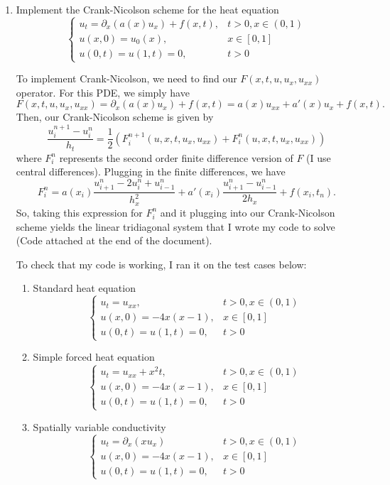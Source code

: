 \documentclass[a4paper,12pt]{article}
\begin{document}
\begin{enumerate}[label = (\arabic*)]
	\item Implement the Crank-Nicolson scheme for the heat equation
	\[
		\begin{cases}
			u_t = \partial_x (a(x) u_x) + f(x,t), & t > 0, x\in (0,1) \\
			u(x,0) = u_0(x), & x \in [0,1] \\
			u(0,t) = u(1,t) = 0, & t > 0
		\end{cases}
	\]
	
	To implement Crank-Nicolson, we need to find our $ F(x,t,u,u_x, u_{xx}) $ operator. For this PDE, we simply have
	\[
		F(x,t,u,u_x,u_{xx}) = \partial_x(a(x) u_x) + f(x,t) = a(x) u_{xx} + a'(x) u_x + f(x,t).
	\]
	Then, our Crank-Nicolson scheme is given by
	\[
		\frac{u_i^{n + 1} - u_i^n}{h_t} = \frac{1}{2}\left(F_i^{n + 1}(u, x, t, u_x, u_{xx}) + F_i^{n}(u, x, t, u_x, u_{xx})\right)
	\]
	where $ F_i^n $ represents the second order finite difference version of $ F $ (I use central differences). Plugging in the finite differences, we have
	\[
		F_i^n = a(x_i) \frac{u_{i+1}^n - 2u_{i}^n + u_{i - 1}^n}{h_x^2} + a'(x_i) \frac{u_{i+1}^n - u_{i - 1}^n}{2h_x} + f(x_i, t_n).
	\]
	So, taking this expression for $ F_i^n $ and it plugging into our Crank-Nicolson scheme yields the linear tridiagonal system that I wrote my code to solve (Code attached at the end of the document).

	To check that my code is working, I ran it on the test cases below:
	\begin{enumerate}[label = (\alph*)]
		\item Standard heat equation
			\[
				\begin{cases}
					u_t = u_{xx}, & t > 0, x\in (0,1) \\
					u(x,0) = -4x(x-1), & x \in [0,1] \\
					u(0,t) = u(1,t) = 0, & t > 0
				\end{cases}
			\]
			
		\item Simple forced heat equation
			\[
				\begin{cases}
					u_t = u_{xx} + x^2 t, & t > 0, x\in (0,1) \\
					u(x,0) = -4x(x-1), & x \in [0,1] \\
					u(0,t) = u(1,t) = 0, & t > 0
				\end{cases}
			\]
		
		\item Spatially variable conductivity
			\[
				\begin{cases}
					u_t = \partial_x(x u_x) & t > 0, x\in (0,1) \\
					u(x,0) = -4x(x-1), & x \in [0,1] \\
					u(0,t) = u(1,t) = 0, & t > 0
				\end{cases}
			\]
			

\end{enumerate}
\end{enumerate}
\end{document}
